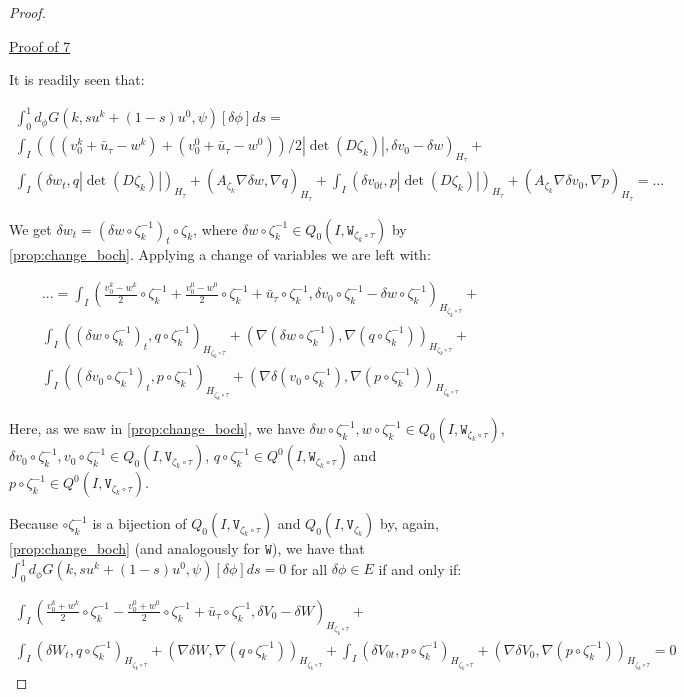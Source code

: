 \documentclass[english,a4paper,10pt,oneside]{scrbook}	%
\theoremstyle{break}
\newenvironment{mproof}[1][\proofname]{%
  \begin{proof}[#1]$ $\par\nobreak\ignorespaces
}{%
  \end{proof}
}
\renewcommand*{\proofname}{Proof}
\theoremstyle{remark}
\newcommand{\tw}[1]{\texttt{#1}}
\begin{document}
\begin{mproof}
\underline{Proof of 7}

It is readily seen that:

\begin{align*}
\int_0^1d_\phi G(k, su^k + (1-s)u^0,\psi)[\delta \phi]ds = \\
\int_I (((v_0^k+\bar{u}_\tau - w^k)+(v_0^0+\bar{u}_\tau - w^0))/2|\det(D\zeta_k)|,\delta v_0-\delta w)_{H_\tau}+\\
\int_I ( \delta w_t , q |\det(D\zeta_k)|)_{H_\tau}+ (A_{\zeta_k}\nabla \delta w, \nabla q)_{H_\tau}+
\int_I ( \delta v_{0t},p |\det(D\zeta_k)|)_{H_\tau} + (A_{\zeta_k} \nabla \delta v_0, \nabla p)_{H_\tau} = ...
\end{align*}

We get $ \delta w_t  = (\delta w\circ \zeta_k^{-1})_t\circ \zeta_k$, where $\delta w\circ \zeta_k^{-1} \in Q_0(I,\tw{W}_{\zeta_k \circ \tau})$ by \cref{prop:change_boch}.
Applying a change of variables we are left with:

\begin{align*}
... = \int_I \left (\frac{v_0^k-w^k}{2}\circ \zeta_k^{-1}+ \frac{v_0^0-w^0}{2}\circ \zeta_k^{-1}+\bar{u}_\tau\circ \zeta_k^{-1} ,\delta v_0\circ \zeta_k^{-1}-\delta w\circ \zeta_k^{-1}\right)_{H_{\zeta_k \circ \tau}}+\\
\int_I ((\delta w\circ \zeta_k^{-1})_t , q\circ \zeta_k^{-1} )_{H_{\zeta_k \circ \tau}}+ (\nabla (\delta w\circ \zeta_k^{-1}), \nabla( q\circ \zeta_k^{-1}))_{H_{\zeta_k \circ \tau}}+\\
\int_I ( (\delta v_{0}\circ \zeta_k^{-1})_t,p \circ \zeta_k^{-1})_{H_{\zeta_k \circ \tau}} + ( \nabla \delta (v_0\circ \zeta_k^{-1}), \nabla (p\circ \zeta_k^{-1}))_{H_{\zeta_k \circ \tau}}
\end{align*}

Here, as we saw in \cref{prop:change_boch}, we have $\delta w\circ \zeta_k^{-1}, w\circ \zeta_k^{-1} \in Q_0(I, \tw{W}_{\zeta_k \circ \tau})$, $ \delta v_{0}\circ \zeta_k^{-1}, v_{0}\circ \zeta_k^{-1} \in Q_0(I,\tw{V}_{\zeta_k \circ \tau})$, $q\circ \zeta_k^{-1}\in Q^0(I, \tw{W}_{\zeta_k \circ \tau})$ and $p\circ \zeta_k^{-1}\in Q^0(I, \tw{V}_{\zeta_k \circ \tau})$.

Because $\circ \zeta_k^{-1}$ is a bijection of $Q_0(I,\tw{V}_{\zeta_k \circ \tau})$ and $Q_0(I,\tw{V}_{\zeta_k})$ by, again, \cref{prop:change_boch} (and analogously for $\tw{W}$), we have that  $\int_0^1 d_\phi G(k, su^k + (1-s)u^0,\psi)[\delta \phi]ds=0$ for all $\delta \phi \in E$ if and only if:

\begin{align*}
\int_I \left (\frac{v_0^k+w^k}{2}\circ \zeta_k^{-1}- \frac{v_0^0+w^0}{2}\circ \zeta_k^{-1}+\bar{u}_\tau\circ \zeta_k^{-1} ,\delta V_0-\delta W\right)_{H_{\zeta_k \circ \tau}}+\\
\int_I ( \delta W_t , q\circ \zeta_k^{-1})_{H_{\zeta_k \circ \tau}}+ (\nabla\delta W, \nabla( q\circ \zeta_k^{-1}))_{H_{\zeta_k \circ \tau}}+
\int_I ( \delta V_{0t},p \circ \zeta_k^{-1})_{H_{\zeta_k \circ \tau}} + ( \nabla \delta V_0, \nabla (p\circ \zeta_k^{-1}))_{H_{\zeta_k \circ \tau}} = 0
\end{align*}


\end{mproof}
\end{document}
